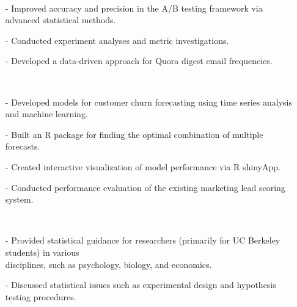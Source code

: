 \documentclass{res}
\begin{document}
\begin{resume}
     \\
    \begin{itemize}
     \item[-] Improved accuracy and precision in the A/B testing framework via advanced statistical methods.
     \item[-] Conducted experiment analyses and metric investigations.
     \item[-] Developed a data-driven approach for Quora digest email frequencies.
     \end{itemize}  
   
     \\
    \begin{itemize}
     \item[-] Developed models for customer churn forecasting using time series analysis and machine learning.
     \item[-] Built an R package for finding the optimal combination of multiple forecasts.
     \item[-] Created interactive visualization of model performance via R shinyApp.
     \item[-] Conducted performance evaluation of the existing marketing lead scoring system.
     \end{itemize}
     
     \\ 
    \begin{itemize}
     \item[-] Provided statistical guidance for researchers (primarily for UC Berkeley students) in various \\disciplines, such as psychology, biology, and economics.
     \item[-] Discussed statistical issues such as experimental design and hypothesis testing procedures.    
    \end{itemize}        
    

\end{resume}
\end{document}
